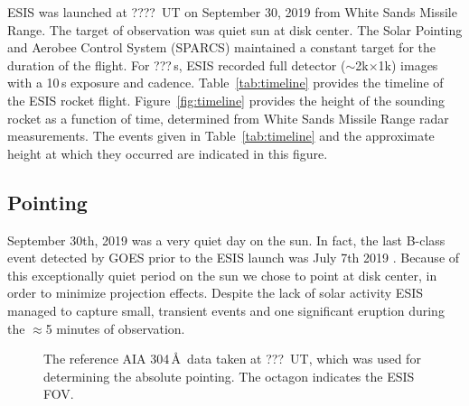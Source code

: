 		ESIS was launched at ????~UT on September 30, 2019 from White Sands Missile Range.  The target of observation was quiet sun at disk center.  The Solar Pointing and Aerobee Control System (SPARCS) maintained a constant target for the duration of the flight.  For ???\,s, ESIS recorded full detector ($\sim$2k$\times$1k) images with a 10\,s exposure and cadence. %
		Table~\ref{tab:timeline} provides the timeline of the ESIS rocket flight. Figure~\ref{fig:timeline} provides the height of the sounding rocket as a function of time, determined from White Sands Missile Range radar measurements.  The events given in Table~\ref{tab:timeline} and the approximate height at which they occurred are indicated in this figure.


	\subsection{Pointing} \label{sec:point}
		September 30th, 2019 was a very quiet day on the sun.  
		In fact, the last  B-class event detected by GOES \citep{GOES} prior to the ESIS launch was July 7th 2019 .  
		Because of this exceptionally quiet period on the sun we chose to point at disk center, in order to minimize projection effects.  
		Despite the lack of solar activity ESIS managed to capture  small, transient events and one significant eruption during the $\approx$5 minutes of observation.
		
		\begin{figure}[ht]
			\begin{center}
				\caption{The reference AIA 304\,\AA\ data taken at ???~UT, which was used for determining the absolute pointing. The octagon indicates the ESIS FOV.}
				\label{fig:fov}
			\end{center}
		\end{figure}
	
